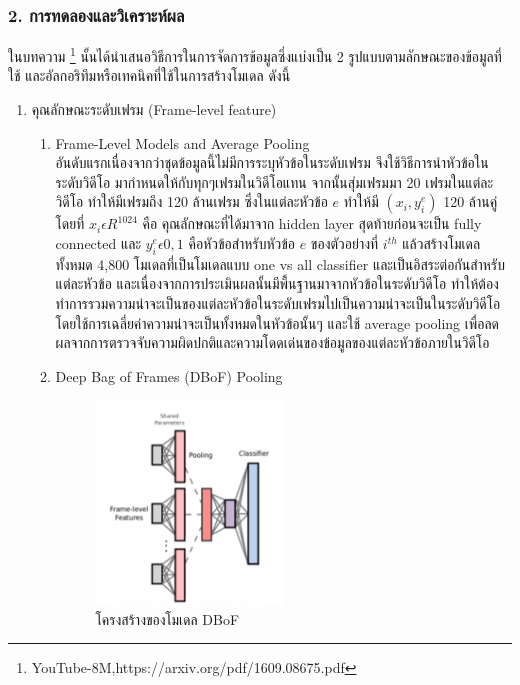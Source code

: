 \subsubsection*{2. การทดลองและวิเคราะห์ผล}
ในบทความ \footnote{YouTube-8M,https://arxiv.org/pdf/1609.08675.pdf} นั้นได้นำเสนอวิธีการในการจัดการข้อมูลซึ่งแบ่งเป็น 2 รูปแบบตามลักษณะของข้อมูลที่ใช้ และอัลกอริทึมหรือเทคนิคที่ใช้ในการสร้างโมเดล ดังนี้
\begin{enumerate}
	\setlength\itemsep{-0.25em}
	\item คุณลักษณะระดับเฟรม (Frame-level feature)
	\begin{enumerate}
		\setlength\itemsep{-0.25em}
		\item Frame-Level Models and Average Pooling
		\\ อันดับแรกเนื่องจากว่าชุดข้อมูลนี้ไม่มีการระบุหัวข้อในระดับเฟรม จึงใช้วิธีการนำหัวข้อในระดับวิดีโอ มากำหนดให้กับทุกๆเฟรมในวิดีโอแทน จากนั้นสุ่มเฟรมมา 20 เฟรมในแต่ละวิดีโอ ทำให้มีเฟรมถึง 120 ล้านเฟรม ซึ่งในแต่ละหัวข้อ $e$ ทำให้มี $(x_{i}, y_{i}^{e})$ 120 ล้านคู่ โดยที่ $x_{i} \epsilon  R^{1024}$ คือ คุณลักษณะที่ได้มาจาก hidden layer สุดท้ายก่อนจะเป็น fully connected และ $y_{i}^{e} \epsilon  0,1$ คือหัวข้อสำหรับหัวข้อ $e$ ของตัวอย่างที่ $i^{th}$ แล้วสร้างโมเดลทั้งหมด 4,800 โมเดลที่เป็นโมเดลแบบ one vs all classifier และเป็นอิสระต่อกันสำหรับแต่ละหัวข้อ และเนื่องจากการประเมินผลนั้นมีพื้นฐานมาจากหัวข้อในระดับวิดีโอ ทำให้ต้องทำการรวมความน่าจะเป็นของแต่ละหัวข้อในระดับเฟรมไปเป็นความน่าจะเป็นในระดับวิดีโอ โดยใช้การเฉลี่ยค่าความน่าจะเป็นทั้งหมดในหัวข้อนั้นๆ และใช้ average pooling เพื่อลดผลจากการตรวจจับความผิดปกติและความโดดเด่นของข้อมูลของแต่ละหัวข้อภายในวิดีโอ
		\clearpage
		\item Deep Bag of Frames (DBoF) Pooling
		\begin{figure}[!ht]
			\centering
			\includegraphics[width=0.5\textwidth]{chapter2/images/DBoF.png}
				\caption{โครงสร้างของโมเดล DBoF}

\end{figure}
\end{enumerate}
\end{enumerate}

